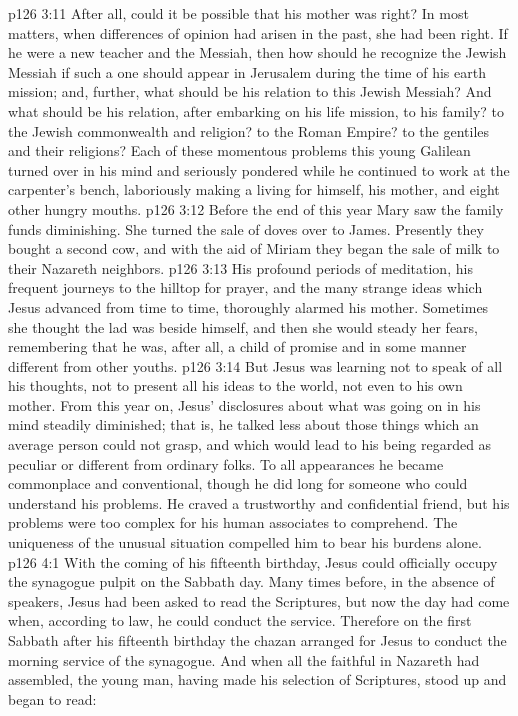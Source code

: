 \vs p126 3:11 After all, could it be possible that his mother was right? In most matters, when differences of opinion had arisen in the past, she had been right. If he were a new teacher and  the Messiah, then how should he recognize the Jewish Messiah if such a one should appear in Jerusalem during the time of his earth mission; and, further, what should be his relation to this Jewish Messiah? And what should be his relation, after embarking on his life mission, to his family? to the Jewish commonwealth and religion? to the Roman Empire? to the gentiles and their religions? Each of these momentous problems this young Galilean turned over in his mind and seriously pondered while he continued to work at the carpenter’s bench, laboriously making a living for himself, his mother, and eight other hungry mouths.
\pc \vs p126 3:12 Before the end of this year Mary saw the family funds diminishing. She turned the sale of doves over to James. Presently they bought a second cow, and with the aid of Miriam they began the sale of milk to their Nazareth neighbors.
\pc \vs p126 3:13 His profound periods of meditation, his frequent journeys to the hilltop for prayer, and the many strange ideas which Jesus advanced from time to time, thoroughly alarmed his mother. Sometimes she thought the lad was beside himself, and then she would steady her fears, remembering that he was, after all, a child of promise and in some manner different from other youths.\plusone
\vs p126 3:14 But Jesus was learning not to speak of all his thoughts, not to present all his ideas to the world, not even to his own mother. From this year on, Jesus’ disclosures about what was going on in his mind steadily diminished; that is, he talked less about those things which an average person could not grasp, and which would lead to his being regarded as peculiar or different from ordinary folks. To all appearances he became commonplace and conventional, though he did long for someone who could understand his problems. He craved a trustworthy and confidential friend, but his problems were too complex for his human associates to comprehend. The uniqueness of the unusual situation compelled him to bear his burdens alone.
\vs p126 4:1 With the coming of his fifteenth birthday, Jesus could officially occupy the synagogue pulpit on the Sabbath day. Many times before, in the absence of speakers, Jesus had been asked to read the Scriptures, but now the day had come when, according to law, he could conduct the service. Therefore on the first Sabbath after his fifteenth birthday the chazan arranged for Jesus to conduct the morning service of the synagogue. And when all the faithful in Nazareth had assembled, the young man, having made his selection of Scriptures, stood up and began to read:
